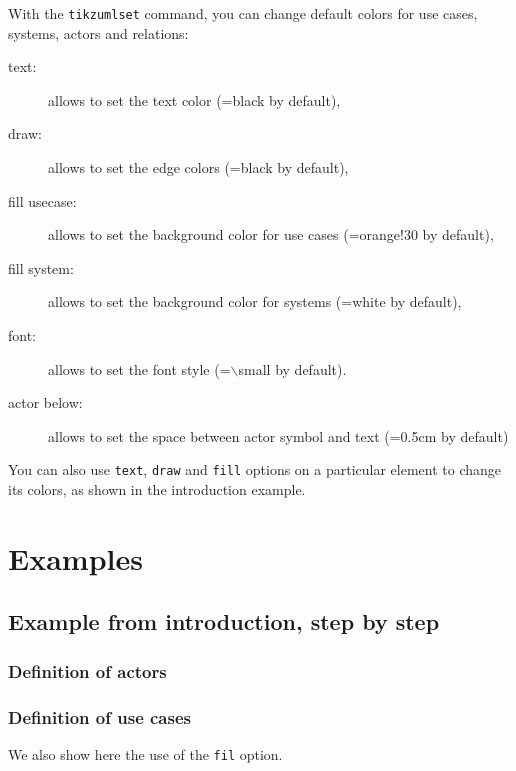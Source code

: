 \documentclass[a4paper,11pt]{report}
\begin{document}
With the {\tt tikzumlset} command, you can change default colors for use cases, systems, actors and relations:

\begin{description}
	\item[text:] allows to set the text color (=black by default),
	\item[draw:] allows to set the edge colors (=black by default),
	\item[fill usecase:] allows to set the background color for use cases (=orange!30 by default),
	\item[fill system:] allows to set the background color for systems (=white by default),
	\item[font:] allows to set the font style (=$\backslash$small by default).
	\item[actor below:] allows to set the space between actor symbol and text (=0.5cm by default)
\end{description}

You can also use {\tt text}, {\tt draw} and {\tt fill} options on a particular element to change its colors, as shown in the introduction example.

\section{Examples}

\subsection{Example from introduction, step by step}

\subsubsection{Definition of actors}

{\color{red!70!black}
	
}

\begin{center}
\end{center}

\subsubsection{Definition of use cases}

We also show here the use of the {\tt fil} option.

	{\color{red!70!black}
		\vspace{-0.4cm}
	}

\end{document}
